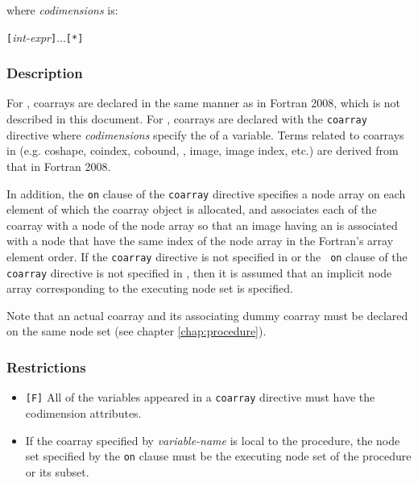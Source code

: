 where {\it codimensions} is:

\vspace{0.3cm}
\hspace{0.5cm} {\openb}{\tt [}{\it int-expr}{\tt ]}...{\closeb}{\tt [*]}

\subsubsection*{Description}

For {\XMPF}, coarrays are declared in the same manner as in Fortran
2008, which is not described in this document.
%
For {\XMPC}, coarrays are declared with the {\tt coarray} directive
where {\it codimensions} specify the  of a variable.
%
Terms related to coarrays in {\XMP} (e.g. coshape, coindex,
cobound, , image, image index, etc.) are derived from
that in Fortran 2008.

In addition, the {\tt on} clause of the {\tt coarray} directive
specifies a node array on each element of which the coarray object is
allocated, and associates each {\it {}} of the coarray with a
node of the node array so that an image having an {\it {}} is associated with a node that have the same index of the node
array in the Fortran's array element order.
%
If the {\tt coarray} directive is not specified in {\XMPF} or the {\tt
on} clause of the {\tt coarray} directive is not specified in {\XMPC},
then it is assumed that an implicit node array corresponding to the
executing node set is specified.

Note that an actual coarray and its associating dummy coarray must be
declared on the same node set (see chapter \ref{chap:procedure}).

\subsubsection*{Restrictions}

\begin{itemize}
 \item \verb![F]! All of the variables appeared in a {\tt coarray}
       directive must have the codimension attributes.
 \item If the coarray specified by {\it variable-name} is local to the
       procedure, the node set specified by the {\tt on} clause must be
       the executing node set of the procedure or its subset.
\end{itemize}

